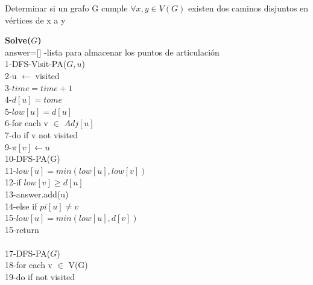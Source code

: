\documentclass{article}
\begin{document}
    \begin{algorithm}
        \caption{Determinar si un grafo G cumple $\forall x,y\in V(G)$  existen dos caminos disjuntos en v\'ertices de x a y }
        \textbf{Solve($G$)\\}
        answer=[] -lista para almacenar los puntos de articulaci\'on\\
        1-\hspace*{1em}DFS-Visit-PA($G,u$) \\ 
        2-\hspace*{2em}u $\leftarrow$ visited \\
        3-\hspace*{2em}$time=time+1$ \\
        4-\hspace*{2em}$d[u]=tome$\\
        5-\hspace*{2em}$low[u]=d[u]$\\ 
        6-\hspace*{2em}for each v $\in$ $Adj[u]$\\
        7-\hspace*{3em}do if v not visited\\
        9-\hspace*{4em}$\pi[v] \leftarrow u$\\
        10-\hspace*{4em}DFS-PA(G)\\
        11-\hspace*{4em}$low[u]=min(low[u],low[v])$\\
        12-\hspace*{4em}if $low[v]\ge d[u]$\\
        13-\hspace*{5em}answer.add(u)\\
        14-\hspace*{3em}else if $pi[u]\ne v$\\
        15-\hspace*{4em}$low[u]=min(low[u],d[v])$\\ 
        15-\hspace*{2em}return\\\\
        17-\hspace*{1em}DFS-PA($G$)\\
        18-\hspace*{2em}for each v $\in$ V(G)\\
        19-\hspace*{3em}do if not visited\\

\end{algorithm}
\end{document}
